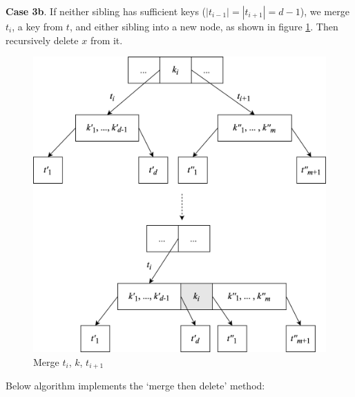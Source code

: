 \documentclass[b5paper]{article}
\begin{document}
\textbf{Case 3b}. If neither sibling has sufficient keys ($|t_{i-1}| = |t_{i+1}| = d - 1$), we merge $t_i$, a key from $t$, and either sibling into a new node, as shown in figure \ref{fig:btree-del-merge-subtree}. Then recursively delete $x$ from it.

\begin{figure}[htbp]
  \centering
  \includegraphics[scale=0.65]{img/btree-del-merge-subtree.png}
  \caption{Merge $t_i$, $k$, $t_{i+1}$}
  \label{fig:btree-del-merge-subtree}
\end{figure}

Below  algorithm implements the `merge then delete' method:
\end{document}

